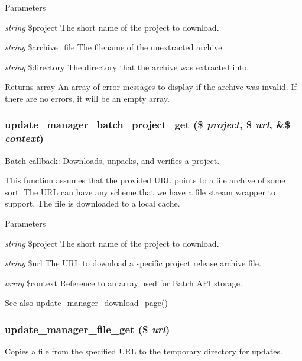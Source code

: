 \begin{DoxyParams}{Parameters}
\item[{\em string}]\$project The short name of the project to download. \item[{\em string}]\$archive\_\-file The filename of the unextracted archive. \item[{\em string}]\$directory The directory that the archive was extracted into.\end{DoxyParams}
\begin{DoxyReturn}{Returns}
array An array of error messages to display if the archive was invalid. If there are no errors, it will be an empty array. 
\end{DoxyReturn}
\hypertarget{group__update__manager__file_gad7fdbc7766b87956b181eb5fbec9a609}{
\subsubsection[{update\_\-manager\_\-batch\_\-project\_\-get}]{\setlength{\rightskip}{0pt plus 5cm}update\_\-manager\_\-batch\_\-project\_\-get (\$ {\em project}, \/  \$ {\em url}, \/  \&\$ {\em context})}}
\label{group__update__manager__file_gad7fdbc7766b87956b181eb5fbec9a609}
Batch callback: Downloads, unpacks, and verifies a project.

This function assumes that the provided URL points to a file archive of some sort. The URL can have any scheme that we have a file stream wrapper to support. The file is downloaded to a local cache.


\begin{DoxyParams}{Parameters}
\item[{\em string}]\$project The short name of the project to download. \item[{\em string}]\$url The URL to download a specific project release archive file. \item[{\em array}]\$context Reference to an array used for Batch API storage.\end{DoxyParams}
\begin{DoxySeeAlso}{See also}
update\_\-manager\_\-download\_\-page() 
\end{DoxySeeAlso}
\hypertarget{group__update__manager__file_gaef701662a2b3a2bfff2c0b819860a547}{
\subsubsection[{update\_\-manager\_\-file\_\-get}]{\setlength{\rightskip}{0pt plus 5cm}update\_\-manager\_\-file\_\-get (\$ {\em url})}}
\label{group__update__manager__file_gaef701662a2b3a2bfff2c0b819860a547}
Copies a file from the specified URL to the temporary directory for updates.

